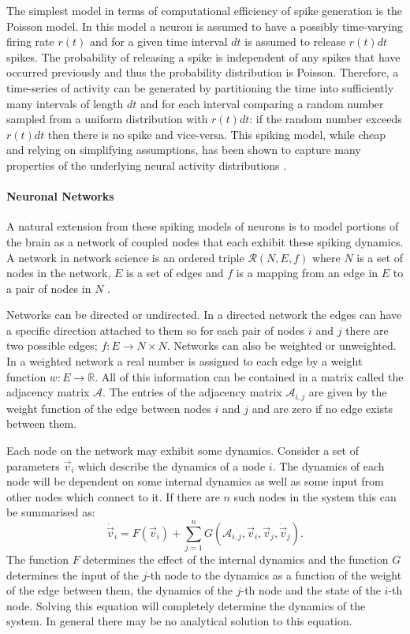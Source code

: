 The simplest model in terms of computational efficiency of spike generation is the Poisson model. In this model a neuron is assumed to have a possibly time-varying firing rate $r(t)$ and for a given time interval $dt$ is assumed to release $r(t) dt$ spikes. The probability of releasing a spike is independent of any spikes that have occurred previously and thus the probability distribution is Poisson. Therefore, a time-series of activity can be generated by partitioning the time into sufficiently many intervals of length $dt$ and for each interval comparing a random number sampled from a uniform distribution with $r(t)dt$: if the random number exceeds $r(t)dt$ then there is no spike and vice-versa. This spiking model, while cheap and relying on simplifying assumptions, has been shown to capture many properties of the underlying neural activity distributions \cite{Burkitt2006-wq, Burkitt2006-ne}.

\paragraph{Neuronal Networks}
A natural extension from these spiking models of neurons is to model portions of the brain as a network of coupled nodes that each exhibit these spiking dynamics. A network in network science is an ordered triple $\mathcal{R}(N,E,f)$ where $N$ is a set of nodes in the network, $E$ is a set of edges and $f$ is a mapping from an edge in $E$ to a pair of nodes in $N$ \cite{Barabasi2016-wx}. 

Networks can be directed or undirected. In a directed network the edges can have a specific direction attached to them so for each pair of nodes $i$ and $j$ there are two possible edges; $f: E \rightarrow N\times N$. Networks can also be weighted or unweighted. In a weighted network a real number is assigned to each edge by a weight function $w: E \rightarrow \mathbb{R}$. All of this information can be contained in a matrix called the adjacency matrix $\mathcal{A}$. The entries of the adjacency matrix $\mathcal{A}_{i,j}$ are given by the weight function of the edge between nodes $i$ and $j$ and are zero if no edge exists between them.

Each node on the network may exhibit some dynamics. Consider a set of parameters $\vec{v}_i$ which describe the dynamics of a node $i$. The dynamics of each node will be dependent on some internal dynamics as well as some input from other nodes which connect to it. If there are $n$ such nodes in the system this can be summarised as:
\begin{equation}
\dot{\vec{v}}_i=F(\vec{v}_i)+\sum_{j=1}^{n} G(\mathcal{A}_{i,j},\vec{v}_i,\vec{v}_j,\dot{\vec{v}}_j).
\end{equation}
The function $F$ determines the effect of the internal dynamics and the function $G$ determines the input of the $j$-th node to the dynamics as a function of the weight of the edge between them, the dynamics of the $j$-th node and the state of the $i$-th node. Solving this equation will completely determine the dynamics of the system. In general there may be no analytical solution to this equation.

